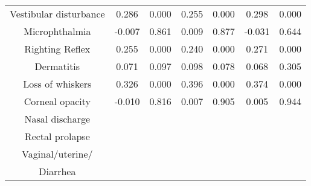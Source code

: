 \documentclass[11pt,reqno]{amsart}
\begin{document}
\begin{table}
\begin{tabular}{|c|c|c|c|c|c|c|}
Vestibular disturbance       & 0.286    & 0.000  & 0.255  & 0.000  & 0.298   & 0.000  \\
Microphthalmia               & -0.007   & 0.861  & 0.009  & 0.877  & -0.031  & 0.644  \\
Righting Reflex              & 0.255    & 0.000  & 0.240  & 0.000  & 0.271   & 0.000  \\
Dermatitis                   & 0.071    & 0.097  & 0.098  & 0.078  & 0.068   & 0.305  \\
Loss of whiskers             & 0.326    & 0.000  & 0.396  & 0.000  & 0.374   & 0.000  \\
Corneal opacity              & -0.010   & 0.816  & 0.007  & 0.905  & 0.005   & 0.944  \\
Nasal discharge              &          &        &        &        &         &        \\
Rectal prolapse              &          &        &        &        &         &        \\
Vaginal/uterine/             &          &        &        &        &         &        \\
Diarrhea                     &          &        &        &        &         &       \\
\hline
\end{tabular}
\end{table}
\end{document}
